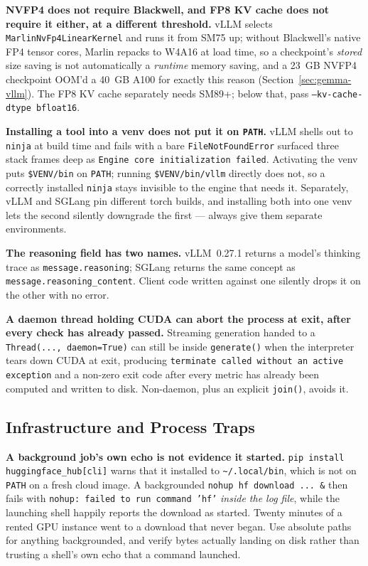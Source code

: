 \documentclass[11pt]{article}
\begin{document}
\textbf{NVFP4 does not require Blackwell, and FP8 KV cache does not require it
either, at a different threshold.} vLLM selects \texttt{MarlinNvFp4LinearKernel} and
runs it from SM75 up; without Blackwell's native FP4 tensor cores, Marlin repacks to
W4A16 at load time, so a checkpoint's \emph{stored} size saving is not automatically a
\emph{runtime} memory saving, and a 23~GB NVFP4 checkpoint OOM'd a 40~GB A100 for
exactly this reason (Section~\ref{sec:gemma-vllm}). The FP8 KV cache separately needs
SM89+; below that, pass \texttt{--kv-cache-dtype bfloat16}.

\textbf{Installing a tool into a venv does not put it on \texttt{PATH}.} vLLM shells
out to \texttt{ninja} at build time and fails with a bare \texttt{FileNotFoundError}
surfaced three stack frames deep as \texttt{Engine core initialization failed}.
Activating the venv puts \texttt{\$VENV/bin} on \texttt{PATH}; running
\texttt{\$VENV/bin/vllm} directly does not, so a correctly installed \texttt{ninja}
stays invisible to the engine that needs it. Separately, vLLM and SGLang pin different
torch builds, and installing both into one venv lets the second silently downgrade the
first --- always give them separate environments.

\textbf{The reasoning field has two names.} vLLM~0.27.1 returns a model's thinking
trace as \texttt{message.reasoning}; SGLang returns the same concept as
\texttt{message.reasoning\_content}. Client code written against one silently drops it
on the other with no error.

\textbf{A daemon thread holding CUDA can abort the process at exit, after every check
has already passed.} Streaming generation handed to a \texttt{Thread(...,
daemon=True)} can still be inside \texttt{generate()} when the interpreter tears down
CUDA at exit, producing \texttt{terminate called without an active exception} and a
non-zero exit code after every metric has already been computed and written to disk.
Non-daemon, plus an explicit \texttt{join()}, avoids it.

\subsection{Infrastructure and Process Traps}

\textbf{A background job's own echo is not evidence it started.} \texttt{pip install
huggingface\_hub[cli]} warns that it installed to \texttt{\textasciitilde/.local/bin},
which is not on \texttt{PATH} on a fresh cloud image. A backgrounded
\texttt{nohup hf download ... \&} then fails with \texttt{nohup: failed to run command
'hf'} \emph{inside the log file}, while the launching shell happily reports the download
as started. Twenty minutes of a rented GPU instance went to a download that never began.
Use absolute paths for anything backgrounded, and verify bytes actually landing on disk
rather than trusting a shell's own echo that a command launched.
\end{document}
